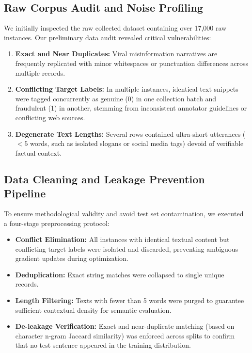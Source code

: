 \documentclass[11pt,a4paper]{article}
\begin{document}
\subsection{Raw Corpus Audit and Noise Profiling}
We initially inspected the raw collected dataset containing over 17,000 raw instances. Our preliminary data audit revealed critical vulnerabilities:
\begin{enumerate}
    \item \textbf{Exact and Near Duplicates:} Viral misinformation narratives are frequently replicated with minor whitespaces or punctuation differences across multiple records.
    \item \textbf{Conflicting Target Labels:} In multiple instances, identical text snippets were tagged concurrently as genuine (0) in one collection batch and fraudulent (1) in another, stemming from inconsistent annotator guidelines or conflicting web sources.
    \item \textbf{Degenerate Text Lengths:} Several rows contained ultra-short utterances ($<5$ words, such as isolated slogans or social media tags) devoid of verifiable factual context.
\end{enumerate}

\subsection{Data Cleaning and Leakage Prevention Pipeline}
To ensure methodological validity and avoid test set contamination, we executed a four-stage preprocessing protocol:
\begin{itemize}
    \item \textbf{Conflict Elimination:} All instances with identical textual content but conflicting target labels were isolated and discarded, preventing ambiguous gradient updates during optimization.
    \item \textbf{Deduplication:} Exact string matches were collapsed to single unique records.
    \item \textbf{Length Filtering:} Texts with fewer than 5 words were purged to guarantee sufficient contextual density for semantic evaluation.
    \item \textbf{De-leakage Verification:} Exact and near-duplicate matching (based on character n-gram Jaccard similarity) was enforced across splits to confirm that no test sentence appeared in the training distribution.
\end{itemize}
\end{document}
